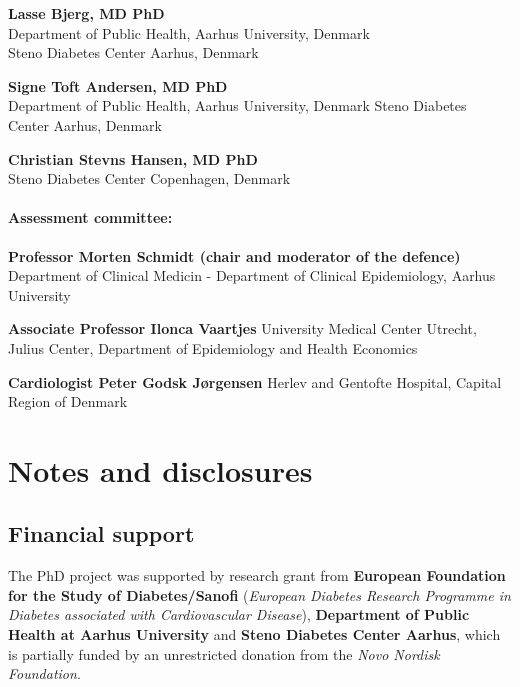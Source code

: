 \documentclass[
  a4paper,
  headsepline=true,
  open=any]{scrbook}
\begin{document}
\textbf{Lasse Bjerg, MD PhD}\\
Department of Public Health, Aarhus University, Denmark\\
Steno Diabetes Center Aarhus, Denmark

\textbf{Signe Toft Andersen, MD PhD}\\
Department of Public Health, Aarhus University, Denmark Steno Diabetes
Center Aarhus, Denmark

\textbf{Christian Stevns Hansen, MD PhD}\\
Steno Diabetes Center Copenhagen, Denmark

\hypertarget{assessment-committee}{%
\subsubsection*{Assessment committee:}\label{assessment-committee}}

\textbf{Professor Morten Schmidt (chair and moderator of the defence)}
Department of Clinical Medicin - Department of Clinical Epidemiology,
Aarhus University

\textbf{Associate Professor Ilonca Vaartjes} University Medical Center
Utrecht, Julius Center, Department of Epidemiology and Health Economics

\textbf{Cardiologist Peter Godsk Jørgensen} Herlev and Gentofte
Hospital, Capital Region of Denmark


\hypertarget{notes-and-disclosures}{%
\chapter*{Notes and disclosures}\label{notes-and-disclosures}}


\hypertarget{financial-support}{%
\section*{Financial support}\label{financial-support}}


The PhD project was supported by research grant from \textbf{European
Foundation for the Study of Diabetes/Sanofi} (\emph{European Diabetes
Research Programme in Diabetes associated with Cardiovascular Disease}),
\textbf{Department of Public Health at Aarhus University} and
\textbf{Steno Diabetes Center Aarhus}, which is partially funded by an
unrestricted donation from the \emph{Novo Nordisk Foundation}.
\end{document}
